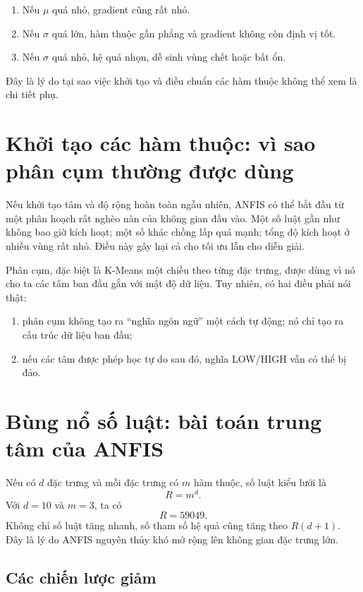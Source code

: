\begin{enumerate}
\item Nếu \(\mu\) quá nhỏ, gradient cũng rất nhỏ.
\item Nếu \(\sigma\) quá lớn, hàm thuộc gần phẳng và gradient không còn định vị tốt.
\item Nếu \(\sigma\) quá nhỏ, hệ quá nhọn, dễ sinh vùng chết hoặc bất ổn.
\end{enumerate}

Đây là lý do tại sao việc khởi tạo và điều chuẩn các hàm thuộc không thể xem là chi tiết phụ.

\section{Khởi tạo các hàm thuộc: vì sao phân cụm thường được dùng}

Nếu khởi tạo tâm và độ rộng hoàn toàn ngẫu nhiên, ANFIS có thể bắt đầu từ một phân hoạch rất nghèo nàn của không gian đầu vào. Một số luật gần như không bao giờ kích hoạt; một số khác chồng lấp quá mạnh; tổng độ kích hoạt ở nhiều vùng rất nhỏ. Điều này gây hại cả cho tối ưu lẫn cho diễn giải.

Phân cụm, đặc biệt là K-Means một chiều theo từng đặc trưng, được dùng vì nó cho ta các tâm ban đầu gắn với mật độ dữ liệu. Tuy nhiên, có hai điều phải nói thật:

\begin{enumerate}
\item phân cụm không tạo ra ``nghĩa ngôn ngữ'' một cách tự động; nó chỉ tạo ra cấu trúc dữ liệu ban đầu;
\item nếu các tâm được phép học tự do sau đó, nghĩa LOW/HIGH vẫn có thể bị đảo.
\end{enumerate}

\section{Bùng nổ số luật: bài toán trung tâm của ANFIS}

Nếu có \(d\) đặc trưng và mỗi đặc trưng có \(m\) hàm thuộc, số luật kiểu lưới là
\[
R=m^d.
\]
Với \(d=10\) và \(m=3\), ta có
\[
R=59049.
\]
Không chỉ số luật tăng nhanh, số tham số hệ quả cũng tăng theo \(R(d+1)\). Đây là lý do ANFIS nguyên thủy khó mở rộng lên không gian đặc trưng lớn.

\subsection{Các chiến lược giảm}

